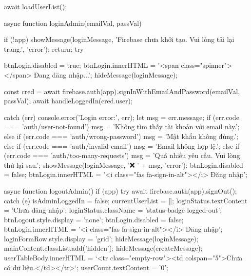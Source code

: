 {{                await loadUserList();
            }

            async function loginAdmin(emailVal, passVal) {
                if (!app) {
                    showMessage(loginMessage, 'Firebase chưa khởi tạo. Vui lòng tải lại trang.', 'error');
                    return;
                }
                try {
                    btnLogin.disabled = true;
                    btnLogin.innerHTML = '<span class="spinner"></span> Đang đăng nhập...';
                    hideMessage(loginMessage);

                    const cred = await firebase.auth(app).signInWithEmailAndPassword(emailVal, passVal);
                    await handleLoggedIn(cred.user);
                } catch (err) {
                    console.error('Login error:', err);
                    let msg = err.message;
                    if (err.code === 'auth/user-not-found') {
                        msg = 'Không tìm thấy tài khoản với email này.';
                    } else if (err.code === 'auth/wrong-password') {
                        msg = 'Mật khẩu không đúng.';
                    } else if (err.code === 'auth/invalid-email') {
                        msg = 'Email không hợp lệ.';
                    } else if (err.code === 'auth/too-many-requests') {
                        msg = 'Quá nhiều yêu cầu. Vui lòng thử lại sau.';
                    }
                    showMessage(loginMessage, '❌ ' + msg, 'error');
                    btnLogin.disabled = false;
                    btnLogin.innerHTML = '<i class="fas fa-sign-in-alt"></i> Đăng nhập';
                }
            }

            async function logoutAdmin() {
                if (app) {
                    try {
                        await firebase.auth(app).signOut();
                    } catch (e) {}
                }
                isAdminLoggedIn = false;
                currentUserList = [];
                loginStatus.textContent = 'Chưa đăng nhập';
                loginStatus.className = 'status-badge logged-out';
                btnLogout.style.display = 'none';
                btnLogin.disabled = false;
                btnLogin.innerHTML = '<i class="fas fa-sign-in-alt"></i> Đăng nhập';
                loginFormRow.style.display = 'grid';
                hideMessage(loginMessage);
                mainContent.classList.add('hidden');
                hideMessage(createMessage);
                userTableBody.innerHTML = `<tr class="empty-row"><td colspan="5">Chưa có dữ liệu.</td></tr>`;
                userCount.textContent = '0';
            }

}
